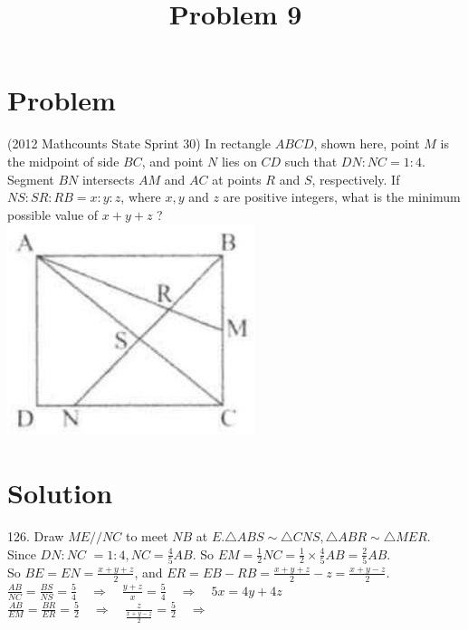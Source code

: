 \documentclass{article}
\title{Problem 9}
\date{}
\begin{document}
\maketitle

\section*{Problem}
(2012 Mathcounts State Sprint 30) In rectangle \(A B C D\), shown here, point \(M\) is the midpoint of side \(B C\), and point \(N\) lies on \(C D\) such that \(D N: N C=1: 4\). Segment \(B N\) intersects \(A M\) and \(A C\) at points \(R\) and \(S\), respectively. If \(N S: S R: R B=x: y: z\), where \(x, y\) and \(z\) are positive integers, what is the minimum possible value of \(x+y+z\) ?\\
\centering
\includegraphics[width=\textwidth]{images/problem_image_1.jpg}

\section*{Solution}
126.
Draw \(M E / / N C\) to meet \(N B\) at \(E . \triangle A B S \sim \triangle C N S, \triangle A B R \sim \triangle M E R\). Since \(D N: N C\) \(=1: 4, N C=\frac{4}{5} A B\). So \(E M=\frac{1}{2} N C=\frac{1}{2} \times \frac{4}{5} A B=\frac{2}{5} A B\).\\
So \(B E=E N=\frac{x+y+z}{2}\), and \(E R=E B-R B=\frac{x+y+z}{2}-z=\frac{x+y-z}{2}\).\\
\(\frac{A B}{N C}=\frac{B S}{N S}=\frac{5}{4} \quad \Rightarrow \quad \frac{y+z}{x}=\frac{5}{4} \quad \Rightarrow \quad 5 x=4 y+4 z\)\\
\(\frac{A B}{E M}=\frac{B R}{E R}=\frac{5}{2} \quad \Rightarrow \quad \frac{z}{\frac{x+y-z}{2}}=\frac{5}{2} \quad \Rightarrow\)
\end{document}
